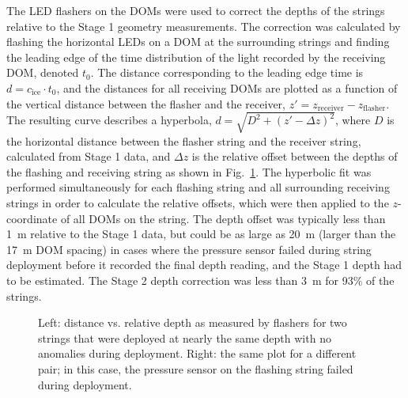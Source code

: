 The LED flashers on the DOMs were used to correct the depths of the strings relative to
the Stage 1 geometry measurements. The correction was calculated by flashing
the horizontal LEDs on a DOM at the surrounding strings and finding the
leading edge of the time distribution of the light recorded by the
receiving DOM, denoted $t_0$. The distance corresponding to the leading
edge time is $d = c_{\mathrm{ice}} \cdot t_0$, and the distances for all receiving
DOMs are plotted as a function of the vertical distance between the flasher
and the receiver, $z' = z_{\mathrm{receiver}} - z_{\mathrm{flasher}}$. The resulting curve
describes a hyperbola, $d = \sqrt{D^2 + (z' -\Delta z)^2}$, where $D$ is
the horizontal distance between the flasher string and the receiver string,
calculated from Stage 1 data, and $\Delta z$ is the relative offset between
the depths of the flashing and receiving string as shown in
Fig.~\ref{fig:geohyperbola}. The hyperbolic fit was performed simultaneously for
each flashing string and all surrounding receiving strings in order to
calculate the relative offsets, which were then applied to the $z$-coordinate
of all DOMs on the string. The depth offset was typically less than 1~m
relative to the Stage 1 data, but could be as large as 20~m (larger than the
17~m DOM spacing) in cases where the pressure sensor failed during string
deployment before it recorded the final depth reading, and the Stage 1 depth
had to be estimated. The Stage 2 depth correction was less than 3~m for 93\%
of the strings.

\begin{figure}[!ht]
  \captionsetup[subfigure]{labelformat=empty} \centering
  \caption{Left: distance vs. relative depth as measured by flashers for
    two strings that were deployed at nearly the same depth with no
    anomalies during deployment. Right: the same plot for a different pair;
    in this case, the pressure sensor on the flashing string failed during
    deployment.}
  \label{fig:geohyperbola}
\end{figure}



